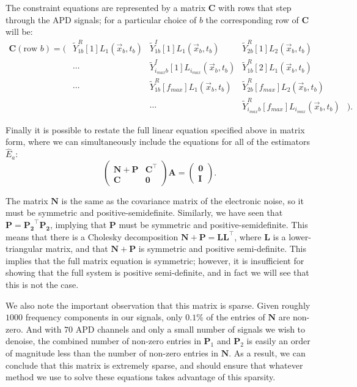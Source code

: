 The constraint equations are represented by a matrix $\mathbf{C}$ with rows that step through the APD signals; for a particular choice of $b$ the corresponding row of $\mathbf{C}$  will be:
\begin{equation} \begin{matrix}
\mathbf{C}(\text{row $b$}) = \bigg( & \widetilde{Y}^R_{1 b}[1] L_1(\vec{x}_b, t_b) & \widetilde{Y}^I_{1 b}[1] L_1(\vec{x}_b, t_b) & \widetilde{Y}^R_{2 b}[1] L_2(\vec{x}_b, t_b) \\
&\cdots & \widetilde{Y}^I_{i_{max} b}[1] L_{i_{max}}(\vec{x}_b, t_b) & \widetilde{Y}^R_{1 b}[2] L_1(\vec{x}_b, t_b) \\
&\cdots & \widetilde{Y}^R_{1 b}[f_{max}] L_1(\vec{x}_b, t_b) & \widetilde{Y}^R_{2 b}[f_{max}] L_2(\vec{x}_b, t_b) \\
& & \cdots & \widetilde{Y}^R_{i_{max} b}[f_{max}] L_{i_{max}}(\vec{x}_b, t_b) & \bigg).
\end{matrix}\end{equation}

Finally it is possible to restate the full linear equation specified above in matrix form, where we can simultaneously include the equations for all of the estimators $\widehat{E}_a$:
\begin{equation}
\begin{pmatrix}
\mathbf{N} + \mathbf{P} & \mathbf{C}^{\top} \\
\mathbf{C} & \mathbf{0}
\end{pmatrix} \mathbf{A} =
\begin{pmatrix}
\mathbf{0} \\
\mathbf{I}
\end{pmatrix}.
\end{equation}

The matrix $\mathbf{N}$ is the same as the covariance matrix of the electronic noise, so it must be symmetric and positive-semidefinite.  Similarly, we have seen that $\mathbf{P} = \mathbf{P_2}^{\top} \mathbf{P_2}$, implying that $\mathbf{P}$ must be symmetric and positive-semidefinite.  This means that there is a Cholesky decomposition $\mathbf{N} + \mathbf{P} = \mathbf{L}\mathbf{L}^{\top}$, where $\mathbf{L}$ is a lower-triangular matrix, and that $\mathbf{N} + \mathbf{P}$ is symmetric and positive semi-definite.  This implies that the full matrix equation is symmetric; however, it is insufficient for showing that the full system is positive semi-definite, and in fact we will see that this is not the case.

We also note the important observation that this matrix is sparse.  Given roughly $1000$ frequency components in our signals, only $0.1\%$ of the entries of $\mathbf{N}$ are non-zero.  And with $70$ APD channels and only a small number of signals we wish to denoise, the combined number of non-zero entries in $\mathbf{P}_1$ and $\mathbf{P}_2$ is easily an order of magnitude less than the number of non-zero entries in $\mathbf{N}$.  As a result, we can conclude that this matrix is extremely sparse, and should ensure that whatever method we use to solve these equations takes advantage of this sparsity.

